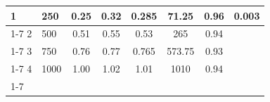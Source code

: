 \documentclass[zihao=5, UTF8]{article}
\theoremstyle{MyLineTheoremStyle} %
\theoremstyle{MyBlockTheoremStyle} %
\theoremstyle{MySubsubsectionStyle} %
\begin{document}
\begin{table}[H]
\begin{tabular}{|l|l|llc|lll|}
		1                                          & 250                                                                                      & \multicolumn{1}{c|}{0.25}                                               & \multicolumn{1}{c|}{0.32}                                               & 0.285                                                                     & \multicolumn{1}{c|}{71.25}                                                                   & \multicolumn{1}{c|}{0.96}                                                                     & \multirow{7}{*}{0.003}                                                               \\ \cline{1-7}
		2                                          & 500                                                                                      & \multicolumn{1}{c|}{0.51}                                               & \multicolumn{1}{c|}{0.55}                                               & 0.53                                                                     & \multicolumn{1}{c|}{265}                                                                   & \multicolumn{1}{c|}{0.94}                                                                     &                                                                                         \\ \cline{1-7}
		3                                          & 750                                                                                      & \multicolumn{1}{c|}{0.76}                                               & \multicolumn{1}{c|}{0.77}                                               & 0.765                                                                    & \multicolumn{1}{c|}{573.75}                                                                   & \multicolumn{1}{c|}{0.93}                                                                     &                                                                                         \\ \cline{1-7}
		4                                          & 1000                                                                                      & \multicolumn{1}{c|}{1.00}                                               & \multicolumn{1}{c|}{1.02}                                               & 1.01                                                                    & \multicolumn{1}{c|}{1010}                                                                   & \multicolumn{1}{c|}{0.94}                                                                     &                                                                                         \\ \cline{1-7}

\end{tabular}
\end{table}
\end{document}
